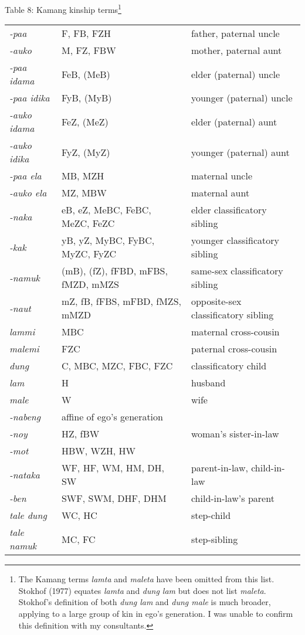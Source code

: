 {\centering
Table 8: Kamang kinship terms\footnote{ The Kamang terms \textit{lamta }and \textit{maleta} have been omitted from this list. Stokhof (1977) equates\textit{ lamta }and \textit{dung lam} but does not list \textit{maleta}. Stokhof{\textquoteright}s definition of both \textit{dung lam } and \textit{dung male} is much broader, applying to a large group of kin in ego{\textquoteright}s generation. I was unable to confirm this definition with my consultants. }
\par}

\begin{center}
\tablehead{}
\begin{supertabular}{m{0.90875983in}m{2.81226in}m{2.3406599in}}
\textit{{}-paa} &
F, FB, FZH &
father, paternal uncle\\
\textit{{}-auko} &
M, FZ, FBW &
mother, paternal aunt\\
\textit{{}-paa idama} &
FeB, (MeB) &
elder (paternal) uncle\\
\textit{{}-paa idika} &
FyB, (MyB) &
younger (paternal) uncle\\
\textit{{}-auko idama} &
FeZ, (MeZ) &
elder (paternal) aunt\\
\textit{{}-auko idika} &
FyZ, (MyZ) &
younger (paternal) aunt\\
\textit{{}-paa ela} &
MB, MZH &
maternal uncle\\
\textit{{}-auko ela} &
MZ, MBW &
maternal aunt\\
\textit{{}-naka} &
eB, eZ, MeBC, FeBC, MeZC, FeZC &
elder classificatory sibling\\
\textit{{}-kak} &
yB, yZ, MyBC, FyBC, MyZC, FyZC &
younger classificatory sibling\\
\textit{{}-namuk} &
(mB), (fZ), fFBD, mFBS, fMZD, mMZS &
same-sex classificatory sibling\\
\textit{{}-naut} &
mZ, fB, fFBS, mFBD, fMZS, mMZD &
opposite-sex classificatory sibling\\
\textit{lammi} &
MBC &
maternal cross-cousin\\
\textit{malemi} &
FZC &
paternal cross-cousin\\
\textit{dung} &
C, MBC, MZC, FBC, FZC &
classificatory child\\
\textit{lam} &
H &
husband\\
\textit{male} &
W &
wife\\
\textit{{}-nabeng} &
affine of ego{\textquoteright}s generation &
\\
\textit{{}-noy} &
HZ, fBW &
woman{\textquoteright}s sister-in-law\\
\textit{{}-mot} &
HBW, WZH, HW &
\\
\textit{{}-nataka} &
WF, HF, WM, HM, DH, SW &
parent-in-law, child-in-law\\
\textit{{}-ben} &
SWF, SWM, DHF, DHM &
child-in-law{\textquoteright}s parent\\
\textit{tale dung} &
WC, HC &
step-child\\
\textit{tale namuk} &
MC, FC &
step-sibling\\
\end{supertabular}
\end{center}

